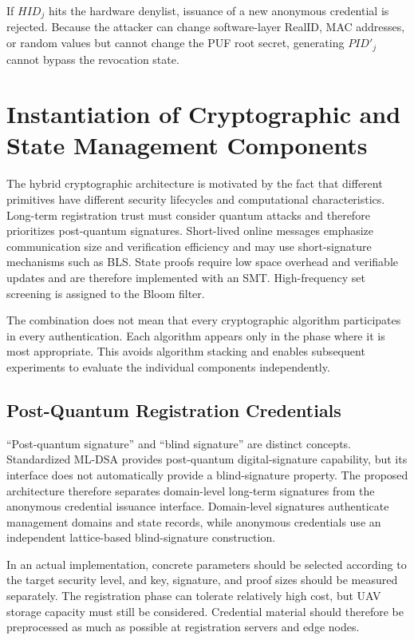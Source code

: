 \documentclass[lettersize,journal]{IEEEtran}
\begin{document}
	If $HID_j$ hits the hardware denylist, issuance of a new anonymous credential is rejected. Because the attacker can change software-layer RealID, MAC addresses, or random values but cannot change the PUF root secret, generating $PID'_j$ cannot bypass the revocation state.
	
	\section{Instantiation of Cryptographic and State Management Components}
	
	The hybrid cryptographic architecture is motivated by the fact that different primitives have different security lifecycles and computational characteristics. Long-term registration trust must consider quantum attacks and therefore prioritizes post-quantum signatures. Short-lived online messages emphasize communication size and verification efficiency and may use short-signature mechanisms such as BLS. State proofs require low space overhead and verifiable updates and are therefore implemented with an SMT. High-frequency set screening is assigned to the Bloom filter.
	
	The combination does not mean that every cryptographic algorithm participates in every authentication. Each algorithm appears only in the phase where it is most appropriate. This avoids algorithm stacking and enables subsequent experiments to evaluate the individual components independently.
	
	\subsection{Post-Quantum Registration Credentials}
	
	``Post-quantum signature'' and ``blind signature'' are distinct concepts. Standardized ML-DSA provides post-quantum digital-signature capability, but its interface does not automatically provide a blind-signature property. The proposed architecture therefore separates domain-level long-term signatures from the anonymous credential issuance interface. Domain-level signatures authenticate management domains and state records, while anonymous credentials use an independent lattice-based blind-signature construction.
	
	In an actual implementation, concrete parameters should be selected according to the target security level, and key, signature, and proof sizes should be measured separately. The registration phase can tolerate relatively high cost, but UAV storage capacity must still be considered. Credential material should therefore be preprocessed as much as possible at registration servers and edge nodes.
	
\end{document}
